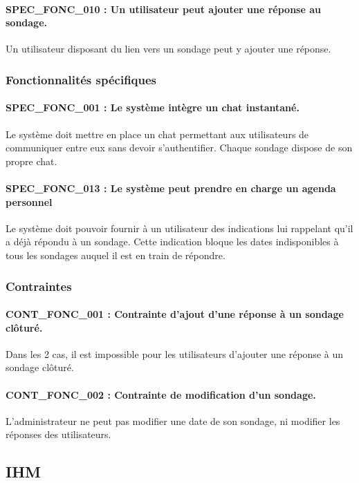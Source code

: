 \documentclass[]{report}
\begin{document}
\paragraph{SPEC\_FONC\_010 : Un utilisateur peut ajouter une réponse au sondage.}
Un utilisateur disposant du lien vers un sondage peut y ajouter une réponse. 

\subsubsection{Fonctionnalités spécifiques}

\paragraph{SPEC\_FONC\_001 : Le système intègre un chat instantané.}
Le système doit mettre en place un chat permettant aux utilisateurs de communiquer entre eux sans devoir s’authentifier. Chaque sondage dispose de son propre chat.

\paragraph{SPEC\_FONC\_013 : Le système peut prendre en charge un agenda personnel}
Le système doit pouvoir fournir à un utilisateur des indications lui rappelant qu’il a déjà répondu à un sondage. Cette indication bloque les dates indisponibles à tous les sondages auquel il est en train de répondre.

\subsubsection{Contraintes}
\paragraph{CONT\_FONC\_001 : Contrainte d’ajout d’une réponse à un sondage clôturé.}
Dans les 2 cas, il est impossible pour les utilisateurs d’ajouter une réponse à un sondage clôturé.

\paragraph{CONT\_FONC\_002 : Contrainte de modification d’un sondage.}
L’administrateur ne peut pas modifier une date de son sondage, ni modifier les réponses des utilisateurs.

\subsection{IHM}
\end{document}
